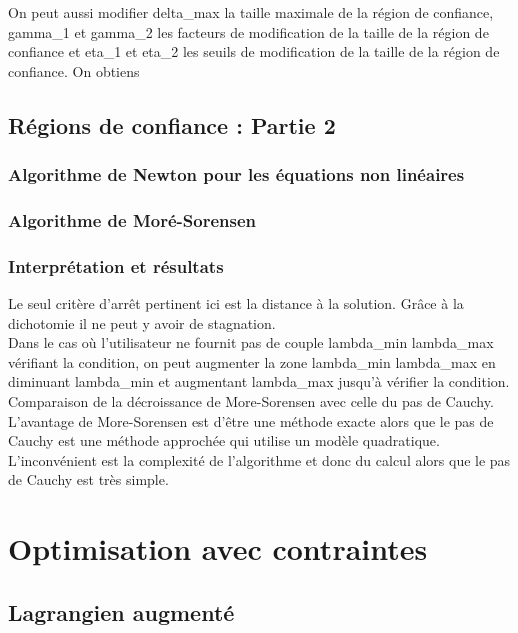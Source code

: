 \documentclass[a4paper,12pt]{article}
\begin{document}
On peut aussi modifier delta\_max la taille maximale de la région de confiance, gamma\_1 et gamma\_2 les facteurs de modification de la taille de la région de confiance et eta\_1 et eta\_2 les seuils de modification de la taille de la région de confiance. On obtiens\\


\newpage
\subsection{Régions de confiance : Partie 2}
\subsubsection{Algorithme de Newton pour les équations non linéaires}
\subsubsection{Algorithme de Moré-Sorensen}

\subsubsection{Interprétation et résultats}
Le seul critère d'arrêt pertinent ici est la distance à la solution. Grâce à la dichotomie il ne peut y avoir de stagnation.\\

Dans le cas où l'utilisateur ne fournit pas de couple lambda\_min lambda\_max vérifiant la condition, on peut augmenter la zone lambda\_min lambda\_max en diminuant lambda\_min et augmentant lambda\_max jusqu'à vérifier la condition.\\

Comparaison de la décroissance de More-Sorensen avec celle du pas de Cauchy.\\

L'avantage de More-Sorensen est d'être une méthode exacte alors que le pas de Cauchy est une méthode approchée qui utilise un modèle quadratique. L'inconvénient est la complexité de l'algorithme et donc du calcul alors que le pas de Cauchy est très simple.\\

\newpage
\section{Optimisation avec contraintes}

\subsection{Lagrangien augmenté}
\end{document}
